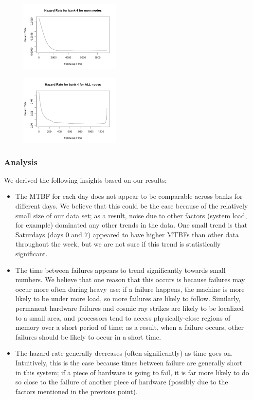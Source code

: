 \begin{figure}
\centering
\includegraphics[width=0.45\textwidth]{images/haz_4_m.png}
\end{figure}

\begin{figure}
\centering
\includegraphics[width=0.45\textwidth]{images/haz_4_a.png}
\end{figure}

\subsubsection{Analysis}

We derived the following insights based on our results:

\begin{itemize}
\item The MTBF for each day does not appear to be comparable across banks for different days.  We believe that this could be the case because of the relatively small size of our data set; as a result, noise due to other factors (system load, for example) dominated any other trends in the data.  One small trend is that Saturdays (days 0 and 7) appeared to have higher MTBFs than other data throughout the week, but we are not sure if this trend is statistically significant.
\item The time between failures appears to trend significantly towards small numbers.  We believe that one reason that this occurs is because failures may occur more often during heavy use; if a failure happens, the machine is more likely to be under more load, so more failures are likely to follow.  Similarly, permanent hardware failures and cosmic ray strikes are likely to be localized to a small area, and processors tend to access physically-close regions of memory over a short period of time; as a result, when a failure occurs, other failures should be likely to occur in a short time.
\item The hazard rate generally decreases (often significantly) as time goes on.  Intuitively, this is the case because times between failure are generally short in this system; if a piece of hardware is going to fail, it is far more likely to do so close to the failure of another piece of hardware (possibly due to the factors mentioned in the previous point).
\end{itemize}
